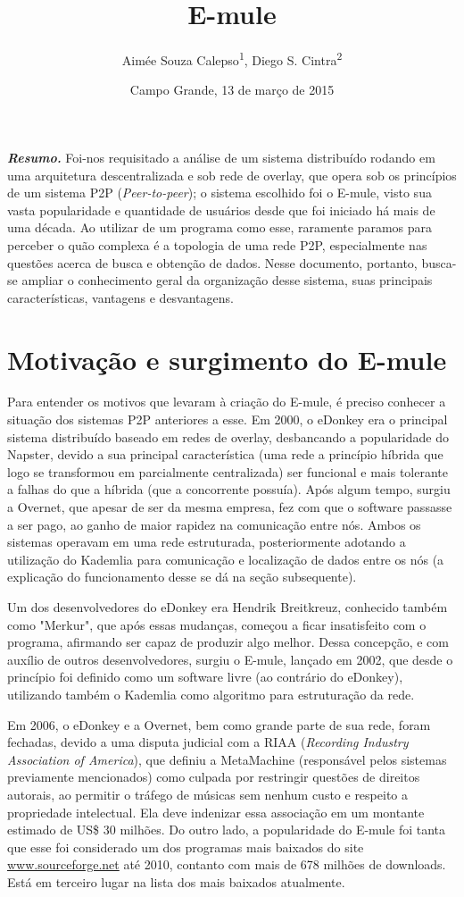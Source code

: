 \documentclass[a4paper]{article}
\title{E-mule}
\author{Aimée Souza Calepso\textsuperscript{1}, Diego S. Cintra\textsuperscript{2}}
\affil{\textsuperscript{1}Faculdade de Computação – Universidade Federal de Mato Grosso do Sul (UFMS)\\
Caixa Postal 549 – 79.070-900 – Campo Grande – MS – Brasil\\
aimeesc@gmail.com, diego\_2337@hotmail.com}
\date{Campo Grande, 13 de março de 2015}
\begin{document}
\maketitle
\textbf{\textit{Resumo.}} Foi-nos requisitado a análise de um sistema distribuído rodando em uma arquitetura descentralizada e sob rede de 
overlay, que opera sob os princípios de um sistema P2P (\textit{Peer-to-peer}); o sistema escolhido foi o E-mule, visto sua vasta 
popularidade e quantidade de usuários desde que foi iniciado há mais de uma década. Ao utilizar de um programa como esse, raramente paramos 
para perceber o quão complexa é a topologia de uma rede P2P, especialmente nas questões acerca de busca e obtenção de dados. Nesse 
documento, portanto, busca-se ampliar o conhecimento geral da organização desse sistema, suas principais características, vantagens e 
desvantagens.

\section{Motivação e surgimento do E-mule}
	Para entender os motivos que levaram à criação do E-mule, é preciso conhecer a situação dos sistemas P2P anteriores a esse. Em 2000, 
o eDonkey era o principal sistema distribuído baseado em redes de overlay, desbancando a popularidade do Napster, devido a sua principal 
característica (uma rede a princípio híbrida que logo se transformou em parcialmente centralizada) ser funcional e mais tolerante a falhas 
do que a híbrida (que a concorrente possuía). Após algum tempo, surgiu a Overnet, que apesar de ser da mesma empresa, fez com que o software 
passasse a ser pago, ao ganho de maior rapidez na comunicação entre nós. Ambos os sistemas operavam em uma rede estruturada, posteriormente 
adotando a utilização do Kademlia para comunicação e localização de dados entre os nós (a explicação do funcionamento desse se dá na seção 
subsequente).

	Um dos desenvolvedores do eDonkey era Hendrik Breitkreuz, conhecido também como "Merkur", que após essas mudanças, começou a ficar 
insatisfeito com o programa, afirmando ser capaz de produzir algo melhor. Dessa concepção, e com auxílio de outros desenvolvedores, surgiu o 
E-mule, lançado em 2002, que desde o princípio foi definido como um software livre (ao contrário do eDonkey), utilizando também o Kademlia 
como algoritmo para estruturação da rede. 

	Em 2006, o eDonkey e a Overnet, bem como grande parte de sua rede, foram fechadas, devido a uma disputa judicial com a RIAA (\textit
{Recording Industry Association of America}), que definiu a MetaMachine (responsável pelos sistemas previamente mencionados) como culpada 
por restringir questões de direitos autorais, ao permitir o tráfego de músicas sem nenhum custo e respeito a propriedade intelectual. Ela 
deve indenizar essa associação em um montante estimado de US\$ 30 milhões. Do outro lado, a popularidade do E-mule foi tanta que esse foi 
considerado um dos programas mais baixados do site \url{www.sourceforge.net} até 2010, contanto com mais de 678 milhões de downloads. Está 
em terceiro lugar na lista dos mais baixados atualmente.
\end{document}
